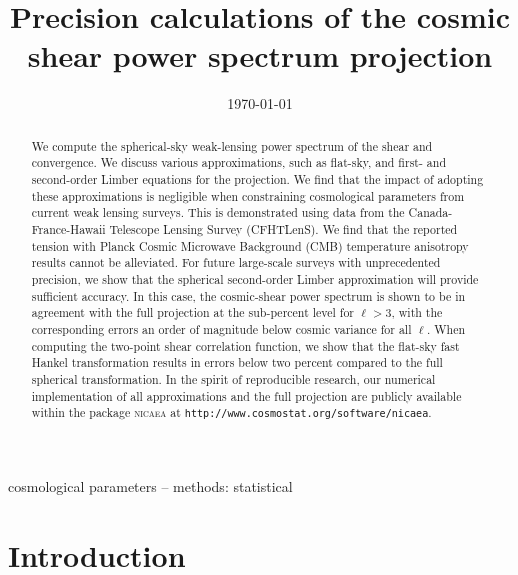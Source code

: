 \documentclass[fleqn,usenatbib]{mnras} %
\title[Precision cosmic-shear projection]{Precision calculations of the cosmic shear power spectrum projection}
\date{\today}
\begin{document}
\setlength{\voffset}{-12mm}

\label{firstpage}


\maketitle
\begin{abstract}

We compute the spherical-sky weak-lensing power spectrum of the shear and
convergence. We discuss various approximations, such as flat-sky, and first- and
second-order Limber equations for the projection. We find that the impact of
adopting these approximations is negligible when constraining cosmological
parameters from current weak lensing surveys.
%
This is demonstrated using data from the Canada-France-Hawaii Telescope Lensing Survey
(CFHTLenS). We find that the reported tension with Planck Cosmic Microwave
Background (CMB) temperature anisotropy results cannot be alleviated.
%
For future large-scale surveys with unprecedented precision, we show that the
spherical second-order Limber approximation will provide sufficient accuracy.
In this case, the cosmic-shear power spectrum is shown to be in agreement with
the full projection at the sub-percent level for $\ell > 3$, with the
corresponding errors an order of magnitude below cosmic variance for all
$\ell$. When computing the two-point shear correlation function, we show that
the flat-sky fast Hankel transformation results in errors below two percent
compared to the full spherical transformation.
%
In the spirit of reproducible research, our numerical implementation of all
approximations and the full projection are publicly available within the
package \textsc{nicaea} at \texttt{http://www.cosmostat.org/software/nicaea}.

\end{abstract}

\begin{keywords}
cosmological parameters -- methods: statistical
\end{keywords}



\section{Introduction}
\label{sec:intro}
\end{document}
